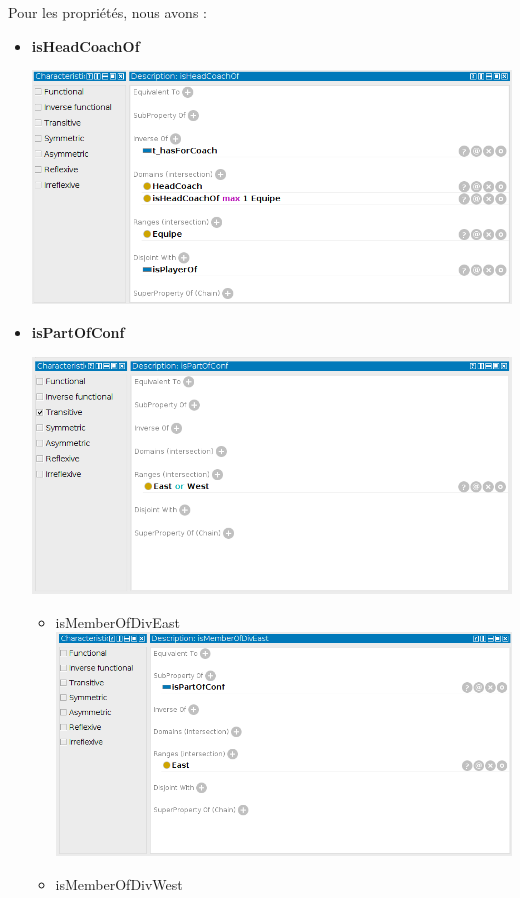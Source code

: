 \documentclass[a4paper,11pt]{article}
\begin{document}
Pour les propriétés, nous avons :
\begin{itemize}
    \item \textbf{isHeadCoachOf} 
    
    \includegraphics[width=.75\linewidth]{./img/1.png} \\
    
    \item \textbf{isPartOfConf}
    
    \includegraphics[width=.75\linewidth]{./img/2.png} \\
    
        \begin{itemize}
            \item isMemberOfDivEast \\
            
            \includegraphics[width=.75\linewidth]{./img/3.png} \\
            
            \newpage
            \item isMemberOfDivWest \\
            

\end{itemize}
\end{itemize}
\end{document}
